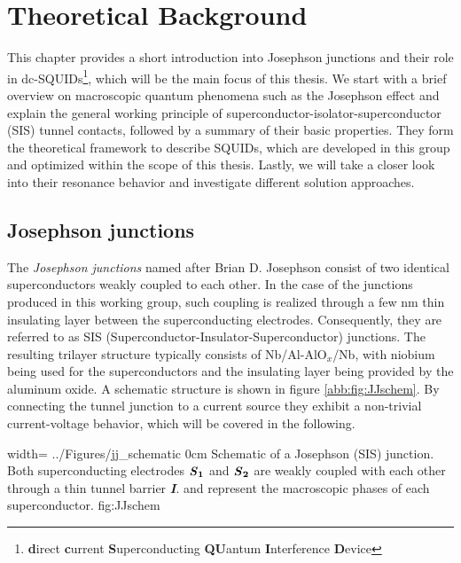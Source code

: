 \chapter{Theoretical Background}

This chapter provides a short introduction into Josephson junctions and their role in dc-SQUIDs\footnote{\textbf{d}irect \textbf{c}urrent \textbf{S}uperconducting \textbf{QU}antum \textbf{I}nterference \textbf{D}evice}, which will be the main focus of this thesis. We start with a brief overview on macroscopic quantum phenomena such as the Josephson effect and explain the general working principle of superconductor-isolator-superconductor (SIS) tunnel contacts, followed by a summary of their basic properties. They form the theoretical framework to describe SQUIDs, which are developed in this group and optimized within the scope of this thesis. Lastly, we will take a closer look into their resonance behavior and investigate different solution approaches. 

\section{Josephson junctions}


The \textit{Josephson junctions} named after Brian D. Josephson consist of two identical superconductors weakly coupled to each other. In the case of the junctions produced in this working group, such coupling is realized through a few nm thin insulating layer between the superconducting electrodes. Consequently, they are referred to as SIS (Superconductor-Insulator-Superconductor) junctions. The resulting trilayer structure typically consists of Nb/Al-Al$\mathrm{O}_x$/Nb, with niobium being used for the superconductors and the insulating layer being provided by the aluminum oxide. A schematic structure is shown in figure \ref{abb:fig:JJschem}. %
By connecting the tunnel junction to a current source they exhibit a non-trivial current-voltage behavior, which will be covered in the following. 


{width=\textwidth}
{../Figures/jj_schematic}
{0cm}
{Schematic of a Josephson (SIS) junction. Both superconducting electrodes $\textbf{\textit{S}}_\textbf{1}$ and $\textbf{\textit{S}}_\textbf{2}$ are weakly coupled with each other through a thin tunnel barrier \textbf{\textit{I}}.  and  represent the macroscopic phases of each superconductor.} 
{fig:JJschem}


